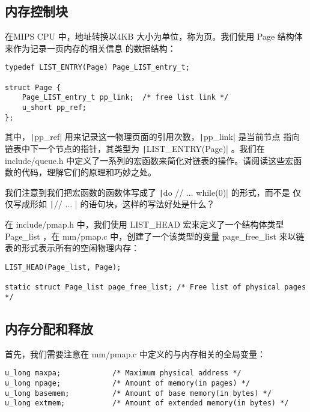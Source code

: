 \subsection{内存控制块}

在MIPS CPU 中，地址转换以4KB 大小为单位，称为页。我们使用 Page 结构体来作为记录一页内存的相关信息
的数据结构：

\begin{verbatim}
typedef LIST_ENTRY(Page) Page_LIST_entry_t;

struct Page {
    Page_LIST_entry_t pp_link;  /* free list link */
    u_short pp_ref;
};
\end{verbatim}

其中，\texttt|pp_ref| 用来记录这一物理页面的引用次数，\texttt|pp_link| 是当前节点
指向链表中下一个节点的指针，其类型为 \texttt|LIST_ENTRY(Page)| 。我们在 include/queue.h 
中定义了一系列的宏函数来简化对链表的操作。请阅读这些宏函数的代码，理解它们的原理和巧妙之处。

\begin{thinking}\label{think-do_while}
我们注意到我们把宏函数的函数体写成了 \texttt|do { // ... } while(0)| 的形式，而不是
仅仅写成形如
\texttt|{// ... }| 的语句块，这样的写法好处是什么？
\end{thinking}

在 include/pmap.h 中，我们使用 LIST\_HEAD 宏来定义了一个结构体类型 Page\_list ，在 mm/pmap.c 
中，创建了一个该类型的变量 page\_free\_list 来以链表的形式表示所有的空闲物理内存：

\begin{verbatim}
LIST_HEAD(Page_list, Page);

static struct Page_list page_free_list; /* Free list of physical pages */
\end{verbatim}

\subsection{内存分配和释放}

首先，我们需要注意在 mm/pmap.c 中定义的与内存相关的全局变量：

\begin{verbatim}
u_long maxpa;            /* Maximum physical address */
u_long npage;            /* Amount of memory(in pages) */
u_long basemem;          /* Amount of base memory(in bytes) */
u_long extmem;           /* Amount of extended memory(in bytes) */
\end{verbatim}

